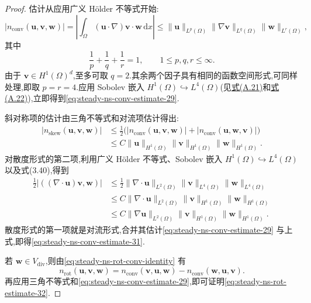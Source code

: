 \begin{proof}
估计从应用广义 Hölder 不等式开始:
\begin{equation}\label{eq:steady-ns-generalized-holder}
  |n_{\mathrm{conv}}(\bm{u},\bm{v},\bm{w})|
   =\left|\int_\Omega(\bm{u}\cdot\nabla)\bm{v}\cdot\bm{w}\,\mathrm{d}x\right|
   \le\|\bm{u}\|_{L^p(\Omega)}
      \|\nabla\bm{v}\|_{L^q(\Omega)}
      \|\bm{w}\|_{L^r(\Omega)},
\end{equation}
其中
\[
  \frac1p+\frac1q+\frac1r=1,
  \qquad 1\le p,q,r\le\infty.
\]
由于 $\bm{v}\in H^1(\Omega)^d$,至多可取 $q=2$.其余两个因子具有相同的函数空间形式,可同样处理,即取 $p=r=4$.应用 Sobolev 嵌入 $H^1(\Omega)\hookrightarrow L^4(\Omega)$(见\hyperref[eq:appendix-a-21]{式(A.21)}和\hyperref[eq:appendix-a-22]{式(A.22)}),立即得到\cref{eq:steady-ns-conv-estimate-29}.

斜对称项的估计由三角不等式和对流项估计得出:
\[
\begin{aligned}
 |n_{\mathrm{skew}}(\bm{u},\bm{v},\bm{w})|
  &\le\frac12\bigl(|n_{\mathrm{conv}}(\bm{u},\bm{v},\bm{w})|
                    +|n_{\mathrm{conv}}(\bm{u},\bm{w},\bm{v})|\bigr)\\
  &\le C\|\bm{u}\|_{H^1(\Omega)}
       \|\bm{v}\|_{H^1(\Omega)}\|\bm{w}\|_{H^1(\Omega)}.
\end{aligned}
\]
对散度形式的第二项,利用广义 Hölder 不等式、Sobolev 嵌入 $H^1(\Omega)\hookrightarrow L^4(\Omega)$ 以及式(3.40),得到
\[
\begin{aligned}
  \frac12|((\nabla\cdot\bm{u})\bm{v},\bm{w})|
    &\le\frac12\|\nabla\cdot\bm{u}\|_{L^2(\Omega)}
       \|\bm{v}\|_{L^4(\Omega)}\|\bm{w}\|_{L^4(\Omega)}\\
    &\le C\|\nabla\cdot\bm{u}\|_{L^2(\Omega)}
       \|\bm{v}\|_{H^1(\Omega)}\|\bm{w}\|_{H^1(\Omega)}\\
    &\le C\|\nabla\bm{u}\|_{L^2(\Omega)}
       \|\bm{v}\|_{H^1(\Omega)}\|\bm{w}\|_{H^1(\Omega)}.
\end{aligned}
\]
散度形式的第一项就是对流形式,合并其估计\cref{eq:steady-ns-conv-estimate-29} 与上式,即得\cref{eq:steady-ns-conv-estimate-31}.

若 $\bm{w}\in V_{\mathrm{div}}$,则由\cref{eq:steady-ns-rot-conv-identity} 有
\begin{equation}\label{eq:steady-ns-rot-conv-split}
  n_{\mathrm{rot}}(\bm{u},\bm{v},\bm{w})
    =n_{\mathrm{conv}}(\bm{v},\bm{u},\bm{w})
      -n_{\mathrm{conv}}(\bm{w},\bm{u},\bm{v}).
\end{equation}
再应用三角不等式和\cref{eq:steady-ns-conv-estimate-29},即可证明\cref{eq:steady-ns-rot-estimate-32}.
\end{proof}

